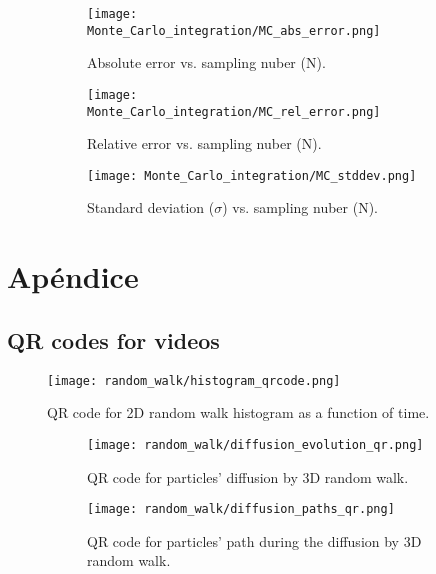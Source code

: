     \begin{figure}[H]
        \centering
        \begin{subfigure}{0.3\textwidth}
            \texttt{[image: Monte\_Carlo\_integration/MC\_abs\_error.png]}
            \caption{Absolute error vs. sampling nuber (N).}
        \end{subfigure}
        \begin{subfigure}{0.3\textwidth}
            \texttt{[image: Monte\_Carlo\_integration/MC\_rel\_error.png]}
            \caption{Relative error vs. sampling nuber (N).}
        \end{subfigure}
        \begin{subfigure}{0.3\textwidth}
            \texttt{[image: Monte\_Carlo\_integration/MC\_stddev.png]}
            \caption{Standard deviation ($\sigma$) vs. sampling nuber (N).}
        \end{subfigure}
        \caption{}
        \label{fig:MC_integration}
    \end{figure}







\clearpage %
\appendix

\section*{Apéndice}
\renewcommand{\thesection}{A\arabic{subsection}} %


\subsection{QR codes for videos}
    \label{appendix:video}

    \begin{figure}[H]
        \centering
        \texttt{[image: random\_walk/histogram\_qrcode.png]}
        \caption{QR code for 2D random walk histogram as a function of time.}
        \label{fig_qr:random_walk_histogram}
    \end{figure}

    \begin{figure}[H]
        \centering
        \begin{subfigure}{0.45\textwidth}
            \texttt{[image: random\_walk/diffusion\_evolution\_qr.png]}
            \caption{QR code for particles' diffusion by 3D random walk.}
            \label{fig_qr:random_walk_evolution}
        \end{subfigure}
        \hfill
        \begin{subfigure}{0.45\textwidth}
        \texttt{[image: random\_walk/diffusion\_paths\_qr.png]}
        \caption{QR code for particles' path during the diffusion by 3D random walk.}
        \label{fig_qr:random_walk_paths}
        \end{subfigure}
        \caption{}
    \end{figure}

